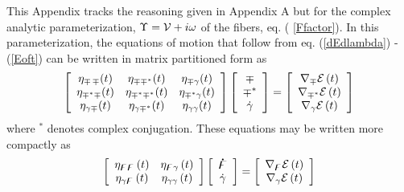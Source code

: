 This Appendix tracks the reasoning given in Appendix A but for the complex
analytic parameterization, $\Upsilon ={\cal V}+i\omega $ of the fibers, eq. (%
\ref{Ffactor}). In this parameterization, the equations of motion that
follow from eq. (\ref{dEdlambda}) - (\ref{Eoft}) can be written in matrix
partitioned form as 
\begin{equation}
\left[ 
\begin{array}{ccc}
\eta _{{\cal \Upsilon }\,{\cal \Upsilon }}(t) & \eta _{{\cal \Upsilon
\Upsilon }^{\ast }}(t) & \eta _{{\cal \Upsilon }\gamma }(t) \\ 
\eta _{{\cal \Upsilon }^{\ast }{\cal \Upsilon }}(t) & \eta _{{\cal \Upsilon }%
^{\ast }{\cal \Upsilon }^{\ast }}(t) & \eta _{{\cal \Upsilon }^{\ast }\gamma
}(t) \\ 
\eta _{\gamma {\cal \Upsilon }}(t) & \eta _{\gamma {\cal \Upsilon }^{\ast
}}(t) & \eta _{\gamma \gamma }(t)%
\end{array}%
\right] \left[ 
\begin{array}{c}
{\cal \Upsilon } \\ 
{\cal \Upsilon }^{\ast } \\ 
\dot{\gamma}%
\end{array}%
\right] =\left[ 
\begin{array}{c}
\nabla _{{\cal \Upsilon }}{\cal E}\left( t\right) \\ 
\nabla _{{\cal \Upsilon }^{\ast }}{\cal E}\left( t\right) \\ 
\nabla _{\gamma }{\cal E}\left( t\right)%
\end{array}%
\right]  \label{3x3partmat}
\end{equation}%
where $^{\ast }$ denotes complex conjugation. These equations may be written
more compactly as 
\begin{equation}
\left[ 
\begin{array}{cc}
\eta _{{\bf \digamma \digamma }}\left( t\right) & \eta _{{\bf \digamma }%
\gamma }\left( t\right) \\ 
\eta _{\gamma {\bf \digamma }}\left( t\right) & \eta _{\gamma \gamma }\left(
t\right)%
\end{array}%
\right] \left[ 
\begin{array}{c}
{\bf \dot{\digamma}} \\ 
\dot{\gamma}%
\end{array}%
\right] =\left[ 
\begin{array}{c}
\nabla _{{\bf \digamma }}{\cal E}\left( t\right) \\ 
\nabla _{\gamma }{\cal E}\left( t\right)%
\end{array}%
\right]  \label{partmat2}
\end{equation}%
